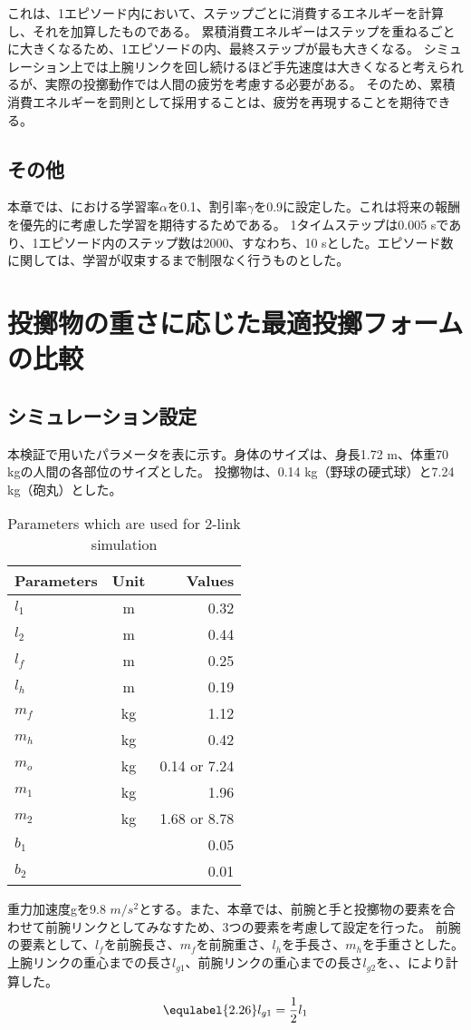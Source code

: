 これは、1エピソード内において、ステップごとに消費するエネルギーを計算し、それを加算したものである。
累積消費エネルギーはステップを重ねるごとに大きくなるため、1エピソードの内、最終ステップが最も大きくなる。
シミュレーション上では上腕リンクを回し続けるほど手先速度は大きくなると考えられるが、実際の投擲動作では人間の疲労を考慮する必要がある。
そのため、累積消費エネルギーを罰則として採用することは、疲労を再現することを期待できる。
\subsection{その他}
本章では、における学習率$\alpha$を0.1、割引率$\gamma$を0.9に設定した。これは将来の報酬を優先的に考慮した学習を期待するためである。
1タイムステップは0.005 sであり、1エピソード内のステップ数は2000、すなわち、10 sとした。エピソード数に関しては、学習が収束するまで制限なく行うものとした。
\section{投擲物の重さに応じた最適投擲フォームの比較}
\subsection{シミュレーション設定}
本検証で用いたパラメータを表に示す。身体のサイズは、身長1.72 m、体重70 kgの人間の各部位のサイズとした。
投擲物は、0.14 kg（野球の硬式球）と7.24 kg（砲丸）とした。
\begin{table}[tb]
  \begin{center}
    \caption{Parameters which are used for 2-link simulation}
    \begin{tabular}{l|c|r}
      \hline
      Parameters & Unit & Values \\
      \hline
      $l_{1}$ & m & 0.32 \\
      $l_{2}$ & m & 0.44 \\
      $l_{f}$ & m & 0.25 \\
      $l_{h}$ & m & 0.19 \\
      $m_{f}$ & kg & 1.12 \\
      $m_{h}$ & kg & 0.42 \\
      $m_{o}$ & kg & 0.14 or 7.24 \\
      $m_{1}$ & kg & 1.96 \\
      $m_{2}$ & kg & 1.68 or 8.78 \\
      $b_{1}$ &  & 0.05 \\
      $b_{2}$ &  & 0.01 \\
      \hline
    \end{tabular}
  \end{center}
\end{table}
重力加速度gを9.8 $m/s^{2}$とする。また、本章では、前腕と手と投擲物の要素を合わせて前腕リンクとしてみなすため、3つの要素を考慮して設定を行った。
前腕の要素として、$l_{f}$を前腕長さ、$m_{f}$を前腕重さ、$l_{h}$を手長さ、$m_{h}$を手重さとした。\\
上腕リンクの重心までの長さ$l_{g1}$、前腕リンクの重心までの長さ$l_{g2}$を、、により計算した。
\begin{eqnarray}
  \equlabel{2.26}
  l_{g1}=\frac{1}{2}l_{1}
\end{eqnarray}

